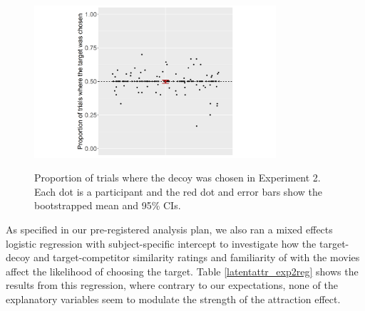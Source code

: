 \documentclass[11pt,a4paper]{article}
\begin{document}
\begin{figure}
\centering
\captionsetup{justification=centering}
\caption{Proportion of trials where the decoy was chosen in Experiment 2. Each dot is a participant and the red dot and error bars show the bootstrapped mean and 95\% CIs.}
\includegraphics[width=0.8\textwidth]{exp2_res.png}
\label{fig:exp2_res}
\end{figure}



As specified in our pre-registered analysis plan, we also ran a mixed effects logistic regression with subject-specific intercept to investigate how the target-decoy and target-competitor similarity ratings and familiarity of with the movies affect the likelihood of choosing the target. Table \ref{latentattr_exp2reg} shows the results from this regression, where contrary to our expectations, none of the explanatory variables seem to modulate the strength of the attraction effect. 
\end{document}
